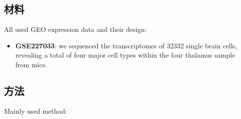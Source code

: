 \documentclass[
]{article}
\providecommand{\tightlist}{%
  \setlength{\itemsep}{0pt}\setlength{\parskip}{0pt}}
\begin{document}
\hypertarget{ux6750ux6599}{%
\subsection{材料}\label{ux6750ux6599}}

All used GEO expression data and their design:

\begin{itemize}
\tightlist
\item
  \textbf{GSE227033}: we sequenced the transcriptomes of 32332 single brain cells, revealing a total of four major cell types within the four thalamus sample from mice.
\end{itemize}

\hypertarget{ux65b9ux6cd5}{%
\subsection{方法}\label{ux65b9ux6cd5}}

Mainly used method:
\end{document}
